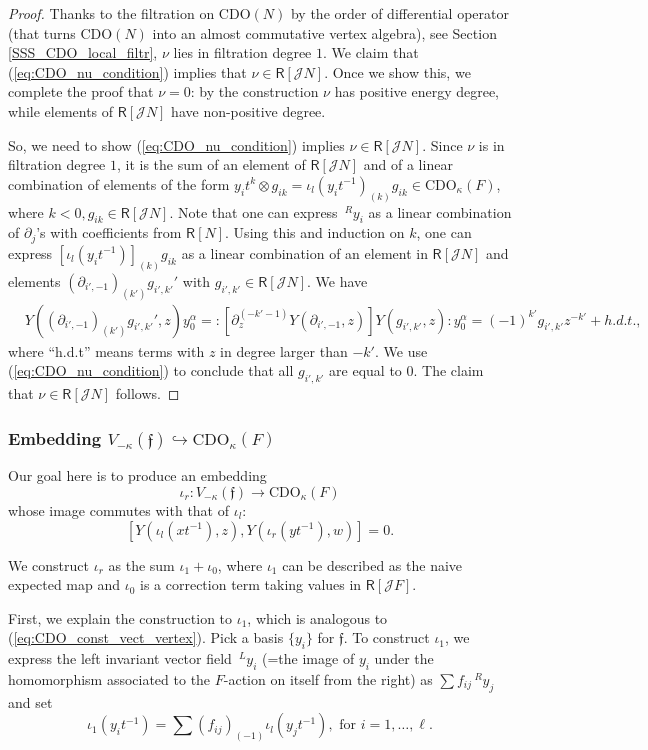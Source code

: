 \documentclass{amsart}
\theoremstyle{definition}
\newcommand{\Ring}{\mathsf{R}}
\newcommand{\Jet}{\mathscr{J}}
\newcommand{\ff}{\mathfrak{f}}
\newcommand{\CDO}{\mathrm{CDO}}
\numberwithin{equation}{section}
\begin{document}
\begin{proof}
    
    Thanks to the filtration on $\CDO(N)$ by the order of differential operator (that turns $\CDO(N)$ into an almost commutative vertex algebra), see Section \ref{SSS_CDO_local_filtr}, 
    $\nu$ lies in filtration degree $1$. 
    We claim that (\ref{eq:CDO_nu_condition}) implies that $\nu\in \Ring[\Jet N]$. Once we show this, we complete the proof that $\nu=0$: by the construction $\nu$ has positive energy degree, while elements of $\Ring[\Jet N]$ have non-positive degree.

    So, we need to show  (\ref{eq:CDO_nu_condition}) implies $\nu\in \Ring[\Jet N]$. Since $\nu$ is in filtration degree $1$, it is the sum of an element of $\Ring[\Jet N]$ and of a linear combination of elements of the form $y_it^{k}\otimes g_{ik}=\iota_l(y_it^{-1})_{(k)}g_{ik}\in \CDO_\kappa(F)$, where $k<0, g_{ik}\in \Ring[\Jet N]$. Note that one can express $\,^R y_i$ as a linear combination of $\partial_{j}$'s with coefficients from $\Ring[N]$. Using this and induction on $k$, one can express $[\iota_l(y_it^{-1})]_{(k)}g_{ik}$ as a linear combination of an element in $\Ring[\Jet N]$ and elements $(\partial_{i',-1})_{(k')}g_{i',k'}'$ with $g_{i',k'}\in \Ring[\Jet N]$. 
    We have 
    \begin{align*}
&Y((\partial_{i',-1})_{(k')}g_{i',k'}',z)y^\alpha_{0}=
    :[\partial_z^{(-k'-1)}Y(\partial_{i',-1},z)]Y(g_{i',k'},z):y^\alpha_{0}=(-1)^{k'}g_{i',k'}z^{-k'}+h.d.t.,
    \end{align*}
    where ``h.d.t'' means terms with $z$ in degree larger than $-k'$.  We use (\ref{eq:CDO_nu_condition}) to conclude that all $g_{i',k'}$ are equal to $0$. The claim that $\nu\in \Ring[\Jet N]$ follows.  
\end{proof}



\subsubsection{Embedding $V_{-\kappa}(\mathfrak{f})\hookrightarrow \CDO_\kappa(F)$}\label{SSS_iota_r}
Our goal here is to produce an embedding
\[
\iota_r: V_{-\kappa}(\ff) \to \CDO_\kappa(F)
\]
whose image commutes with that of $\iota_l$:
$$[Y(\iota_l(xt^{-1}),z),Y(\iota_r(yt^{-1}),w)]=0.$$ 

We construct $\iota_r$ as the sum $\iota_1+\iota_0$, where $\iota_1$ can be described as the naive expected map and $\iota_0$ is a correction term taking values in $\Ring[\Jet F]$.

First, we explain the construction to $\iota_1$, which is analogous to (\ref{eq:CDO_const_vect_vertex}).
Pick a basis $\{y_i\}$ for $\mathfrak{f}$. To construct $\iota_1$, we express the left invariant vector field $\,^Ly_i$ (=the image of $y_i$ under the homomorphism associated to the $F$-action on itself from the right) as $\sum f_{ij} \,^Ry_j$ and set
\[
\iota_1(y_it^{-1}) = \sum (f_{ij})_{(-1)} \iota_l(y_jt^{-1}), \text{ for }i=1,\ldots,\ell.
\]
\end{document}
